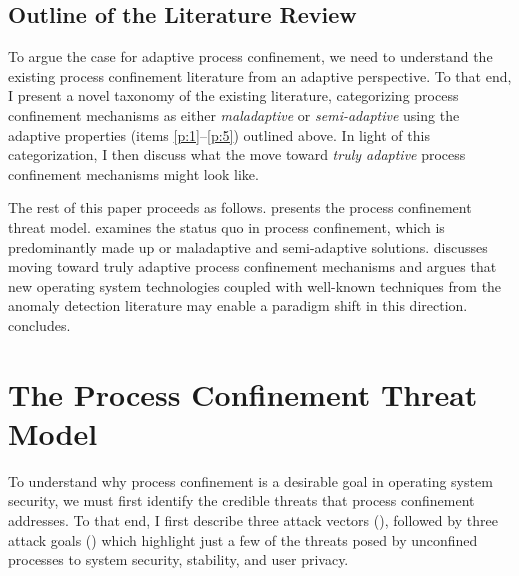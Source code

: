 \documentclass[dvipsnames, 12pt]{article}
\begin{document}
\subsection{Outline of the Literature Review}

To argue the case for adaptive process confinement, we need to understand the
existing process confinement literature from an adaptive perspective. To that
end, I present a novel taxonomy of the existing literature, categorizing process
confinement mechanisms as either \textit{maladaptive} or \textit{semi-adaptive}
using the adaptive properties (items \ref{p:1}--\ref{p:5}) outlined above.
In light of this categorization, I then discuss what the move toward
\textit{truly adaptive} process confinement mechanisms might look like.

The rest of this paper proceeds as follows.  presents the
process confinement threat model.   examines the status quo
in process confinement, which is predominantly made up or maladaptive and
semi-adaptive solutions.  discusses moving toward truly
adaptive process confinement mechanisms and argues that new operating system
technologies coupled with well-known techniques from the anomaly detection
literature may enable a paradigm shift in this direction.  
concludes.

\section{The Process Confinement Threat Model}
\label{sec:threat_model}

To understand why process confinement is a desirable goal in operating system
security, we must first identify the credible threats that process confinement
addresses. To that end, I first describe three attack vectors
(), followed by three attack goals ()
which highlight just a few of the threats posed by unconfined processes to
system security, stability, and user privacy.
\end{document}
